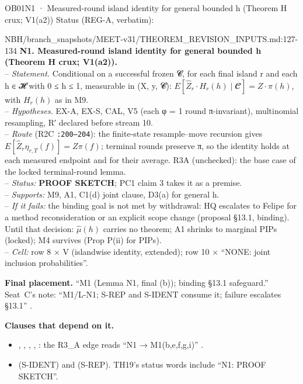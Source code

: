 \begin{card}{OB01}{N1 · Measured-round island identity for general bounded h (Theorem H crux; V1(a2))}
Status (REG-A, verbatim):  
\begin{stmt}{NBH/branch_snapshots/MEET-v31/THEOREM_REVISION_INPUTS.md:127-134}
\textbf{N1. Measured-round island identity for general bounded h (Theorem H crux; V1(a2)).}\\
– \emph{Statement.} Conditional on a successful frozen 𝓒, for each final island r and each h ∈ 𝓗 with 0 ≤ h ≤ 1, measurable in (X, y, 𝓒): $E[\hat{Z}_r\cdot H_r(h) \mid 𝓒] = Z\cdot π(h)$, with $H_r(h)$ as in M9.\\
– \emph{Hypotheses.} EX-A, EX-S, CAL, V5 (each φ = 1 round π-invariant), multinomial resampling, R′ declared before stream 10.\\
– \emph{Route} (R2C \texttt{:200–204}): the finite-state resample–move recursion gives $E[\hat{Z}_r η_{r,T}(f)] = Zπ(f)$; terminal rounds preserve π, so the identity holds at each measured endpoint and for their average. R3A (unchecked): the base case of the locked terminal-round lemma.\\
– \emph{Status:} \textbf{PROOF SKETCH}; PC1 claim 3 takes it as a premise.\\
– \emph{Supports:} M9, A1, C1(d) joint clause, D3(a) for general h.\\
– \emph{If it fails:} the binding goal is not met by withdrawal: HQ escalates to Felipe for a method reconsideration or an explicit scope change (proposal §13.1, binding). Until that decision: $\hat{μ}(h)$ carries no theorem; A1 shrinks to marginal PIPs (locked); M4 survives (Prop P(ii) for PIPs).\\
– \emph{Cell:} row 8 × V (islandwise identity, extended); row 10 × ``NONE: joint inclusion probabilities''.
\end{stmt}
\textbf{Final placement.} ``M1 (Lemma N1, final (b)); binding §13.1 safeguard.'' Seat~C's note: ``M1/L-N1; S-REP and S-IDENT consume it; failure escalates §13.1'' .

\textbf{Clauses that depend on it.}
\begin{itemize}
\item {}, , , , : the R3\_A edge reads ``N1 → M1(b,e,f,g,i)'' .
\item {} (S-IDENT) and  (S-REP). TH19's status words include ``N1: PROOF SKETCH''.
\end{itemize}


\end{card}
